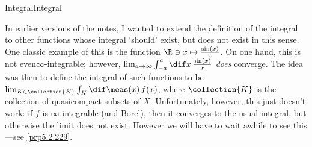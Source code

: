 \begin{dfn}{Integral}{Integral}
\begin{rmk}
\end{rmk}
\begin{rmk}
In earlier versions of the notes, I wanted to extend the definition of the integral to other functions whose integral `should' exist, but does not exist in this sense.  One classic example of this is the function $\R \ni x\mapsto \frac{\sin (x)}{x}$.  On one hand, this is not even$\infty$-integrable; however, $\lim _{a\to \infty}\int _{-a}^a\dif x\, \frac{\sin (x)}{x}$ \emph{does} converge.  The idea was then to define the integral of such functions to be $\lim _{K\in \collection{K}}\int _K\dif \meas (x)\, f(x)$, where $\collection{K}$ is the collection of quasicompact subsets of $X$.  Unfortunately, however, this just doesn't work:  if $f$ is $\infty$-integrable (and Borel), then it converges to the usual integral, but otherwise the limit does not exist.  However we will have to wait awhile to see this---see \cref{prp5.2.229}.


\end{rmk}
\end{dfn}
